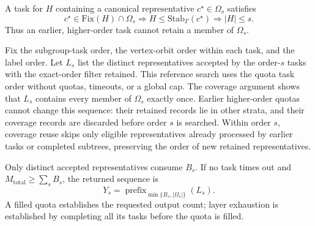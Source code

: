 A task for $H$ containing a canonical representative $c^\star\in\Omega_s$ satisfies
\begin{equation}
 c^\star\in\mathrm{Fix}(H)\cap\Omega_s
 \Longrightarrow H\leq\mathrm{Stab}_{\Gamma}(c^\star)
 \Longrightarrow |H|\leq s.
\label{eq:quota_layer_order}
\end{equation}
Thus an earlier, higher-order task cannot retain a member of $\Omega_s$.

Fix the subgroup-task order, the vertex-orbit order within each task, and the label order. Let $L_s$ list the distinct representatives accepted by the order-$s$ tasks with the exact-order filter retained. This reference search uses the quota task order without quotas, timeouts, or a global cap. The coverage argument shows that $L_s$ contains every member of $\Omega_s$ exactly once. Earlier higher-order quotas cannot change this sequence: their retained records lie in other strata, and their coverage records are discarded before order $s$ is searched. Within order $s$, coverage reuse skips only eligible representatives already processed by earlier tasks or completed subtrees, preserving the order of new retained representatives.

Only distinct accepted representatives consume $B_s$. If no task times out and $M_{\mathrm{total}}\geq\sum_s B_s$, the returned sequence is
\begin{equation}
Y_s=\operatorname{prefix}_{\min\{B_s,|\Omega_s|\}}(L_s).
\label{eq:quota_prefix}
\end{equation}
A filled quota establishes the requested output count; layer exhaustion is established by completing all its tasks before the quota is filled.
